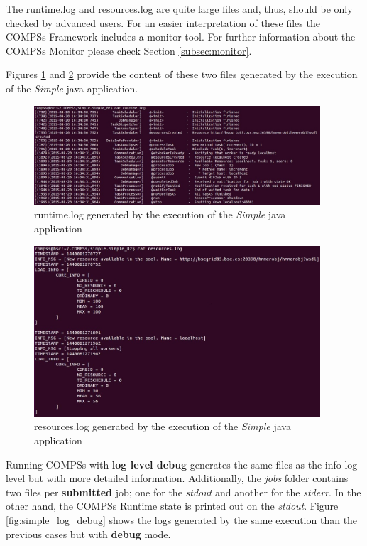 The runtime.log and resources.log are quite large files and, thus, should be only checked by advanced users. For an
easier interpretation of these files the COMPSs Framework includes a monitor tool. For further information about the COMPSs Monitor
please check Section \ref{subsec:monitor}.

Figures \ref{fig:simple_runtimelog} and \ref{fig:simple_resourceslog} provide the content of these two files generated
by the execution of the \textit{Simple} java application. 
\begin{figure}[h!]
  \centering
    \includegraphics[width=0.95\textwidth]{./Sections/3_Results_and_Logs/Figures/simple_runtimelog.jpeg}
    \caption{runtime.log generated by the execution of the \textit{Simple} java application}
    \label{fig:simple_runtimelog}
\end{figure}

\begin{figure}[h!]
  \centering
    \includegraphics[width=0.95\textwidth]{./Sections/3_Results_and_Logs/Figures/simple_resourceslog.jpeg}
    \caption{resources.log generated by the execution of the \textit{Simple} java application}
    \label{fig:simple_resourceslog}
\end{figure}

Running COMPSs with \textbf{log level debug} generates the same files as the info log level but with more detailed information.
Additionally, the \textit{jobs} folder contains two files per \textbf{submitted} job; one for the \textit{stdout} and another for
the \textit{stderr}. In the other hand, the COMPSs Runtime state is printed out on the \textit{stdout}. Figure 
\ref{fig:simple_log_debug} shows the logs generated by the same execution than the previous cases 
but with \textbf{debug} mode. 

